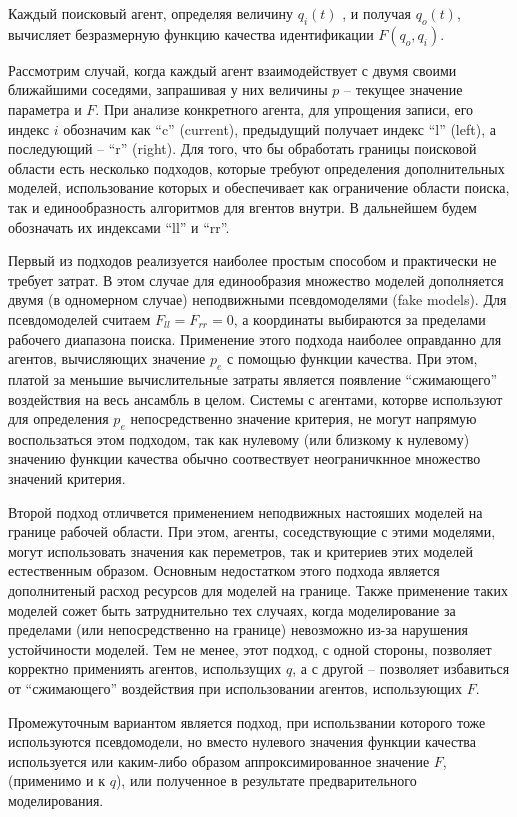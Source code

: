 Каждый поисковый агент, определяя величину $q_{i}(t)$ , и получая $q_o(t)$,
вычисляет безразмерную функцию качества идентификации
$F(q_o,q_i)$.

Рассмотрим случай, когда каждый агент взаимодействует с двумя своими ближайшими соседями,
запрашивая у них величины $p$ -- текущее значение параметра и $F$.
При анализе конкретного агента, для упрощения записи, его индекс $i$ обозначим как ``c'' (current),
предыдущий получает индекс ``l'' (left), а последующий -- ``r'' (right).
Для того, что бы обработать границы поисковой области есть несколько подходов,
которые требуют определения дополнительных моделей, использование которых
и обеспечивает как ограничение области поиска, так и единообразность
алгоритмов для вгентов внутри.
В дальнейшем будем обозначать их индексами ``ll'' и ``rr''.

Первый из подходов реализуется наиболее простым способом
и практически не требует затрат.
В этом случае для единообразия множество моделей дополняется двумя
(в одномерном случае) неподвижными псевдомоделями (fake models).
Для псевдомоделей считаем $  F_{ll} = F_{rr} = 0$,
а координаты выбираются за пределами рабочего диапазона поиска.
Применение этого подхода наиболее оправданно для агентов,
вычисляющих значение $p_e$ с помощью функции качества.
При этом, платой за меньшие вычислительные затраты
является появление ``сжимающего'' воздействия на весь ансамбль в целом.
Системы с агентами, которве используют для определения $p_e$ непосредственно значение критерия,
не могут напрямую воспользаться этом подходом,
так как нулевому (или близкому к нулевому) значению функции качества
обычно соотвествует неограничкнное множество значений критерия.

Второй подход отличвется применением неподвижных настояших моделей
на границе рабочей области. При этом, агенты, соседствующие с этими моделями,
могут использовать  значения как переметров, так и критериев этих
моделей естественным образом. Основным недостатком этого подхода
является дополнитеный расход ресурсов для моделей на границе.
Также применение таких моделей сожет быть затруднительно тех случаях,
когда моделирование за пределами (или непосредственно на границе)
невозможно из-за нарушения устойчиности моделей.
Тем не менее, этот подход, с одной стороны,
позволяет корректно примениять агентов, использущих $q$,
а с другой -- позволяет избавиться от ``сжимающего'' воздействия
при использовании агентов, использующих $F$.

Промежуточным вариантом является подход,
при использвании которого тоже используются
псевдомодели, но вместо нулевого значения
функции качества используется или каким-либо образом аппроксимированное
значение $F$, (применимо и к $q$), или полученное в результате
предварительного моделирования.





